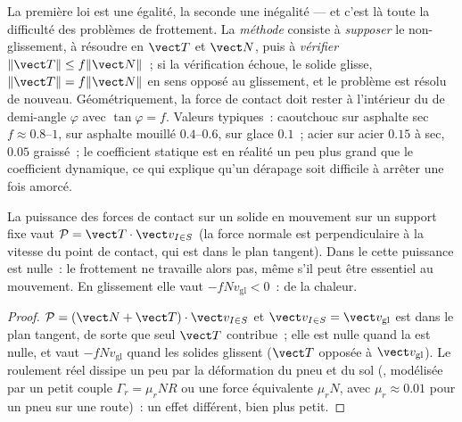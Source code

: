\begin{remark}\label{rem:b2:rigid-body-mechanics:reading}
La première loi est une égalité, la seconde une inégalité --- et c'est là
toute la difficulté des problèmes de frottement. La \emph{méthode} consiste à
\emph{supposer} le non-glissement, à résoudre en $\vect T$ et $\vect N$, puis à
\emph{vérifier} $\|\vect T\| \le f\|\vect N\|$~; si la vérification échoue, le
solide glisse, $\|\vect T\| = f\|\vect N\|$ en sens opposé au glissement, et le
problème est résolu de nouveau. Géométriquement, la force de contact doit rester
à l'intérieur du \emph{} de demi-angle $\varphi$ avec $\tan\varphi
= f$. Valeurs typiques~: caoutchouc sur asphalte sec $f \approx 0.8$--$1$, sur asphalte
mouillé $0.4$--$0.6$, sur glace $0.1$~; acier sur acier $0.15$ à sec, $0.05$
graissé~; le coefficient statique est en réalité un peu plus grand que le
coefficient dynamique, ce qui explique qu'un dérapage soit difficile à arrêter une fois amorcé.
\end{remark}

\begin{proposition}\label{prop:b2:rigid-body-mechanics:power}
La puissance des forces de contact sur un solide en mouvement sur un support fixe vaut
$\mathcal P = \vect T\cdot\vect v_{I\in S}$ (la force normale est
perpendiculaire à la vitesse du point de contact, qui est dans le
plan tangent). Dans le \emph{} cette puissance est nulle~:
le frottement ne travaille alors pas, même s'il peut être essentiel au mouvement.
En glissement elle vaut $-f N v_{\text{gl}} < 0$~: de la chaleur.
\end{proposition}

\begin{proof}
$\mathcal P = (\vect N + \vect T)\cdot\vect v_{I\in S}$ et $\vect
v_{I\in S} = \vect v_{\text{gl}}$ est dans le plan tangent, de sorte que seul
$\vect T$ contribue~; elle est nulle quand la  est nulle, et vaut
$-fNv_{\text{gl}}$ quand les solides glissent ($\vect T$ opposée à $\vect
v_{\text{gl}}$). Le roulement réel dissipe un peu par la
déformation du pneu et du sol (\emph{}, modélisée par un
petit couple $\Gamma_r = \mu_rNR$ ou une force équivalente $\mu_rN$, avec
$\mu_r \approx 0.01$ pour un pneu sur une route)~: un effet différent, bien plus petit.
\end{proof}


